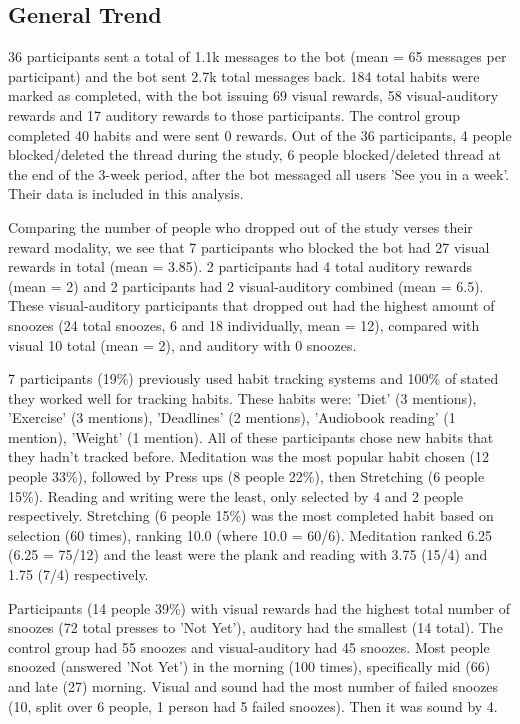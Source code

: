 \documentclass{scaffold/sigchi}
\begin{document}
\subsection{General Trend}
36 participants sent a total of 1.1k messages to the bot (mean = 65 messages per participant) and the bot sent 2.7k total messages back. 184 total habits were marked as completed, with the bot issuing 69 visual rewards, 58 visual-auditory rewards and 17 auditory rewards to those participants. The control group completed 40 habits and were sent 0 rewards. Out of the 36 participants, 4 people blocked/deleted the thread during the study, 6 people blocked/deleted thread at the end of the 3-week period, after the bot messaged all users 'See you in a week'. Their data is included in this analysis.


Comparing the number of people who dropped out of the study verses their reward modality, we see that 7 participants who blocked the bot had 27 visual rewards in total (mean = 3.85). 2 participants had 4 total auditory rewards (mean = 2) and 2 participants had 2 visual-auditory combined (mean = 6.5). These visual-auditory participants that dropped out had the highest amount of snoozes (24 total snoozes, 6 and 18 individually, mean = 12), compared with visual 10 total (mean = 2), and auditory with 0 snoozes.


7 participants (19\%) previously used habit tracking systems and 100\% of stated they worked well for tracking habits. These habits were: 'Diet' (3 mentions), 'Exercise' (3 mentions), 'Deadlines' (2 mentions), 'Audiobook reading' (1 mention), 'Weight' (1 mention). All of these participants chose new habits that they hadn't tracked before. Meditation was the most popular habit chosen (12 people 33\%), followed by Press ups (8 people 22\%), then Stretching (6 people 15\%). Reading and writing were the least, only selected by 4 and 2 people respectively. Stretching (6 people 15\%) was the most completed habit based on selection (60 times), ranking 10.0 (where 10.0 = 60/6). Meditation ranked 6.25 (6.25 = 75/12) and the least were the plank and reading with 3.75 (15/4) and 1.75 (7/4) respectively.


Participants (14 people 39\%) with visual rewards had the highest total number of snoozes (72 total presses to 'Not Yet'), auditory had the smallest (14 total). The control group had 55 snoozes and visual-auditory had 45 snoozes. Most people snoozed (answered 'Not Yet') in the morning (100 times), specifically mid (66) and late (27) morning. Visual and sound had the most number of failed snoozes (10, split over 6 people, 1 person had 5 failed snoozes). Then it was sound by 4.
\end{document}
